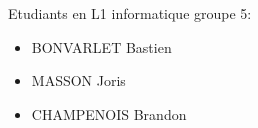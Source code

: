 \documentclass[a4paper, 11pt]{article}
\begin{document}
\vspace{1cm}

Etudiants en L1 informatique groupe 5:\\
\begin{itemize}
\item BONVARLET Bastien\\
\item MASSON Joris\\
\item CHAMPENOIS Brandon\\
\end{itemize}

\newpage
\end{document}
